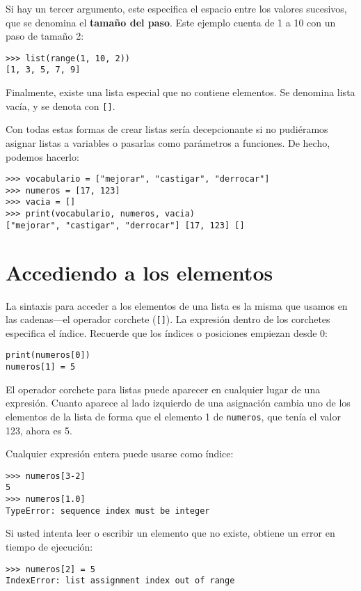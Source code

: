 Si hay un tercer argumento, este especifica el espacio entre los valores
sucesivos, que se denomina el \textbf{tamaño del paso}. Este ejemplo
cuenta de 1 a 10 con un paso de tamaño 2:
\begin{lstlisting}
>>> list(range(1, 10, 2))
[1, 3, 5, 7, 9]
\end{lstlisting}

Finalmente, existe una lista especial que no contiene elementos. Se
denomina lista vacía, y se denota con \texttt{{[}{]}}.

Con todas estas formas de crear listas sería decepcionante si no pudiéramos
asignar listas a variables o pasarlas como parámetros a funciones.
De hecho, podemos hacerlo:
\begin{lstlisting}
>>> vocabulario = ["mejorar", "castigar", "derrocar"]
>>> numeros = [17, 123]
>>> vacia = []
>>> print(vocabulario, numeros, vacia)
["mejorar", "castigar", "derrocar"] [17, 123] []
\end{lstlisting}

\section{Accediendo a los elementos}

 

La sintaxis para acceder a los elementos de una lista es la misma
que usamos en las cadenas—el operador corchete (\texttt{{[}{]}}).
La expresión dentro de los corchetes especifica el índice. Recuerde
que los índices o posiciones empiezan desde 0:
\begin{lstlisting}
print(numeros[0])
numeros[1] = 5
\end{lstlisting}

El operador corchete para listas puede aparecer en cualquier lugar
de una expresión. Cuanto aparece al lado izquierdo de una asignación
cambia uno de los elementos de la lista de forma que el elemento 1
de \texttt{numeros}, que tenía el valor 123, ahora es 5.

Cualquier expresión entera puede usarse como índice:
\begin{lstlisting}
>>> numeros[3-2]
5
>>> numeros[1.0]
TypeError: sequence index must be integer
\end{lstlisting}

Si usted intenta leer o escribir un elemento que no existe, obtiene
un error en tiempo de ejecución:

\begin{lstlisting}
>>> numeros[2] = 5
IndexError: list assignment index out of range
\end{lstlisting}

